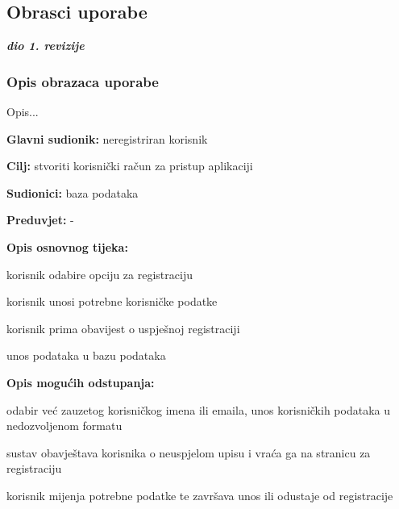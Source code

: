 			\eject 
			
			
				
			\subsection{Obrasci uporabe}
				
				\textbf{\textit{dio 1. revizije}}
				
				\subsubsection{Opis obrazaca uporabe}
					Opis...
					
					\noindent {}
					\begin{packed_item}
	
						\item \textbf{Glavni sudionik: } neregistriran korisnik
						\item  \textbf{Cilj:} stvoriti korisnički račun za pristup aplikaciji
						\item  \textbf{Sudionici:} baza podataka
						\item  \textbf{Preduvjet:} -
						\item  \textbf{Opis osnovnog tijeka:}
						
						\item[] \begin{packed_enum}
	
							\item korisnik odabire opciju za registraciju
							\item korisnik unosi potrebne korisničke podatke
							\item korisnik prima obavijest o uspješnoj registraciji
							\item unos podataka u bazu podataka
						\end{packed_enum}
						
						\item  \textbf{Opis mogućih odstupanja:}
						
						\item[] \begin{packed_item}
	
							\item[2.a] odabir već zauzetog korisničkog imena ili emaila, unos korisničkih podataka u nedozvoljenom formatu
							\item[] \begin{packed_enum}
								\item sustav obavještava korisnika o neuspjelom upisu i vraća ga na stranicu za registraciju
								\item korisnik mijenja potrebne podatke te završava unos ili odustaje od registracije
							\end{packed_enum}
							
						\end{packed_item}
					\end{packed_item}
					
